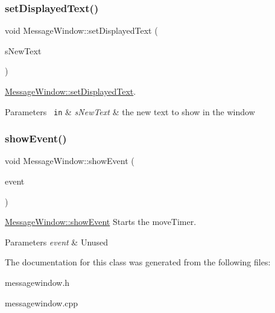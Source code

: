\subsubsection{\texorpdfstring{set\+Displayed\+Text()}{setDisplayedText()}}
{\footnotesize\ttfamily void Message\+Window\+::set\+Displayed\+Text (\begin{DoxyParamCaption}\item[{Q\+String}]{s\+New\+Text }\end{DoxyParamCaption})}



\mbox{\hyperlink{classMessageWindow_ad3b6dcb371660e6a3e0ded36564afafa}{Message\+Window\+::set\+Displayed\+Text}}. 


\begin{DoxyParams}[1]{Parameters}
\mbox{\texttt{ in}}  & {\em s\+New\+Text} & the new text to show in the window \\
\hline
\end{DoxyParams}
\mbox{\label{classMessageWindow_aee9d8dca7a7576d47eab37c8cb30a26d}} 
\subsubsection{\texorpdfstring{show\+Event()}{showEvent()}}
{\footnotesize\ttfamily void Message\+Window\+::show\+Event (\begin{DoxyParamCaption}\item[{Q\+Show\+Event $\ast$}]{event }\end{DoxyParamCaption})}



\mbox{\hyperlink{classMessageWindow_aee9d8dca7a7576d47eab37c8cb30a26d}{Message\+Window\+::show\+Event}} Starts the move\+Timer. 


\begin{DoxyParams}{Parameters}
{\em event} & Unused \\
\hline
\end{DoxyParams}


The documentation for this class was generated from the following files\+:\begin{DoxyCompactItemize}
\item 
messagewindow.\+h\item 
messagewindow.\+cpp\end{DoxyCompactItemize}
